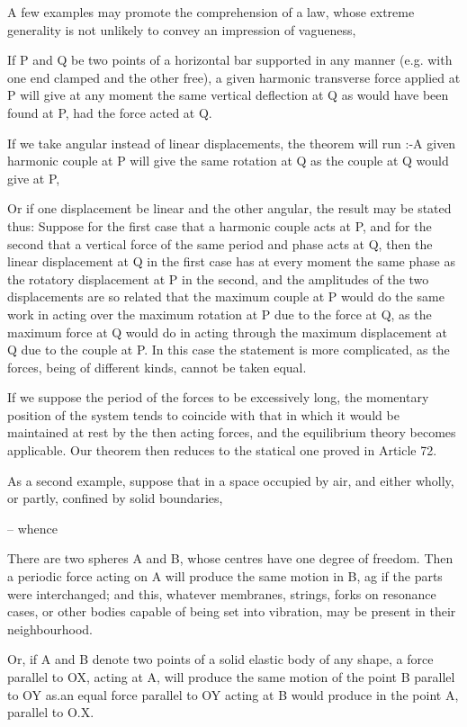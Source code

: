 A few examples may promote the comprehension of a law, whose extreme generality
is not unlikely to convey an impression of vagueness,

If P and Q be two points of a horizontal bar supported in any manner (e.g. with
one end clamped and the other free), a given harmonic transverse force applied
at P will give at any moment the same vertical deflection at Q as would have
been found at P, had the force acted at Q.

If we take angular instead of linear displacements, the theorem will run :-A
given harmonic couple at P will give the same rotation at Q as the couple at Q
would give at P,

Or if one displacement be linear and the other angular, the result may be
stated thus: Suppose for the first case that a harmonic couple acts at P, and
for the second that a vertical force of the same period and phase acts at Q,
then the linear displacement at Q in the first case has at every moment the
same phase as the rotatory displacement at P in the second, and the amplitudes
of the two displacements are so related that the maximum couple at P would do
the same work in acting over the maximum rotation at P due to the force at Q,
as the maximum force at Q would do in acting through the maximum displacement
at Q due to the couple at P. In this case the statement is more complicated, as
the forces, being of different kinds, cannot be taken equal.

If we suppose the period of the forces to be excessively long, the momentary
position of the system tends to coincide with that in which it would be
maintained at rest by the then acting forces, and the equilibrium theory
becomes applicable. Our theorem then reduces to the statical one proved in
Article 72.

As a second example, suppose that in a space occupied by air, and either
wholly, or partly, confined by solid boundaries,

-- whence

There are two spheres A and B, whose centres have one degree of freedom.  Then
a periodic force acting on A will produce the same motion in B, ag if the parts
were interchanged; and this, whatever membranes, strings, forks on resonance
cases, or other bodies capable of being set into vibration, may be present in
their neighbourhood.

Or, if A and B denote two points of a solid elastic body of any shape, a force
parallel to OX, acting at A, will produce the same motion of the point B
parallel to OY as.an equal force parallel to OY acting at B would produce in
the point A, parallel to O.X.

